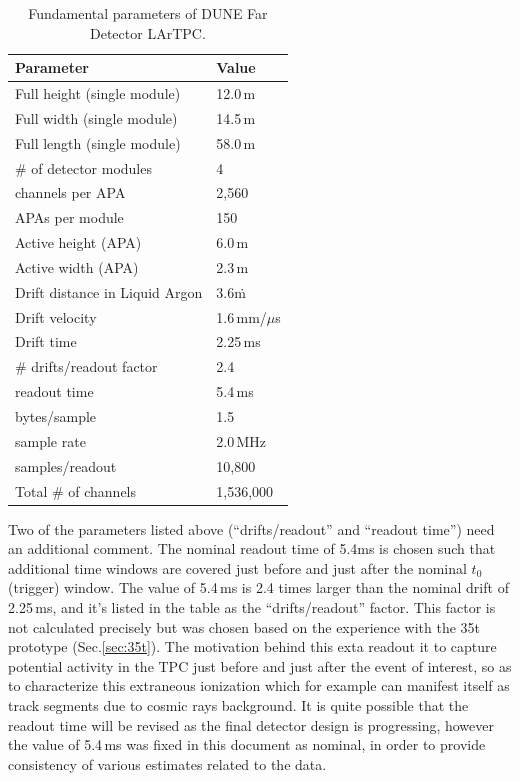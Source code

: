 \begin{table}[ht!]
	\centering
	\begin{tabular}{| p{2.5in} | p{1in} |}
		\hline
		\textbf{Parameter} & \textbf{Value} \\ \hline
		Full height (single module) & 12.0\,m \\ \hline
		Full width (single module) & 14.5\,m \\ \hline
		Full length (single module) & 58.0\,m \\ \hline
		\# of detector modules & 4 \\ \hline
		\hline
		channels per APA & 2,560 \\ \hline
		APAs per module & 150 \\ \hline
		Active height (APA) & 6.0\,m \\ \hline
		Active width (APA) & 2.3\,m \\ \hline  \hline
		Drift distance in Liquid Argon & 3.6\.m \\
		\hline
		Drift velocity & 1.6\,mm/$\mu$s \\ \hline
		Drift time & 2.25\,ms \\ \hline
		\# drifts/readout factor & 2.4 \\ \hline
		readout time & 5.4\,ms \\ \hline \hline
		bytes/sample & 1.5 \\ \hline
		sample rate & 2.0\,MHz \\ \hline
		samples/readout & 10,800 \\
		\hline \hline
		Total \# of channels & 1,536,000 \\
		\hline
	\end{tabular}
	\caption{Fundamental parameters of DUNE Far Detector LArTPC.}
	\label{tab:fundamental-parameters}
\end{table}

Two of the parameters listed above (``drifts/readout'' and ``readout time'') need an additional comment.
The nominal readout time of 5.4ms is chosen such that additional time windows are covered just before and just
after the nominal $t_0$ (trigger) window. The value of 5.4\,ms is 2.4 times larger than the nominal drift of 2.25\,ms,
and it's listed in the table as the ``drifts/readout'' factor. This factor is not calculated precisely but was chosen based
on the experience with the 35t prototype (Sec.\ref{sec:35t}). The motivation behind this exta readout it to capture
potential activity in the TPC just before and just after the event of interest, so as to characterize this extraneous
ionization which for example can manifest itself as track segments due to cosmic rays background. It is quite
possible that the readout time will be revised as the final detector design is progressing, however the value of 5.4\,ms
was fixed in this document as nominal, in order to provide consistency of various estimates related to the data.

